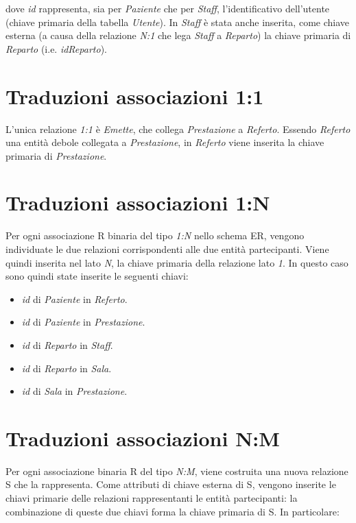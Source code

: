 \documentclass[paper=a4, fontsize=11pt,x11names]{report}
\begin{document}
dove \textit{id} rappresenta, sia per \textit{Paziente} che per \textit{Staff}, l'identificativo dell'utente (chiave primaria della tabella \textit{Utente}). In \textit{Staff} è stata anche inserita, come chiave esterna (a causa della relazione \textit{N:1} che lega \textit{Staff} a \textit{Reparto}) la chiave primaria di \textit{Reparto} (i.e. \textit{idReparto}). 

\section{Traduzioni associazioni 1:1}
L'unica relazione \textit{1:1} è \textit{Emette}, che collega \textit{Prestazione} a \textit{Referto}. Essendo \textit{Referto} una entità debole collegata a \textit{Prestazione}, in \textit{Referto} viene inserita la chiave primaria di \textit{Prestazione}. 

\section{Traduzioni associazioni 1:N}
Per ogni associazione R binaria del tipo \textit{1:N} nello schema ER, vengono individuate le due relazioni corrispondenti alle due entità partecipanti. Viene quindi inserita nel lato \textit{N}, la chiave primaria della relazione lato \textit{1}. In questo caso sono quindi state inserite le seguenti chiavi:
\begin{itemize}
\item \textit{id} di \textit{Paziente} in \textit{Referto}.
\item \textit{id} di \textit{Paziente} in \textit{Prestazione}.
\item \textit{id} di \textit{Reparto} in \textit{Staff}.
\item \textit{id} di \textit{Reparto} in \textit{Sala}.
\item \textit{id} di \textit{Sala} in \textit{Prestazione}.
\end{itemize}

\section{Traduzioni associazioni N:M}
Per ogni associazione binaria R del tipo \textit{N:M}, viene costruita una nuova relazione S che la rappresenta. Come attributi di chiave esterna di S, vengono inserite le chiavi primarie delle relazioni rappresentanti le entità partecipanti: la combinazione di queste due chiavi forma la chiave primaria di S. In particolare:
\end{document}
